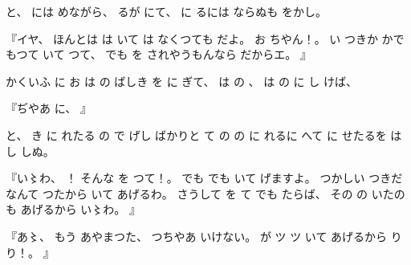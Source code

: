 %
と、
%
には
めながら、
%
るが
にて、
%
に
るには
ならぬも
をかし。

%
『イヤ、
%
ほんとは
は
いて
は
なくつても
だよ。
%
お
ちやん！。
%
い
つきか
かで
もつて
いて
つて、
%
でも
を
されやうもんなら
だからエ。
』

%
かくいふ
に
お
は
の
ばしき
を
に
ぎて、
%
は%
の
、
%
は%
の%
に
し
けば、

%
『ぢやあ
に、
』

%
と、
%
き
に
れたる
の
で
げし
ばかりと
て
の
の%
に
れるに
へて
に
せたるを
は
し
しぬ。

%
『い〻わ、%
%
！\inhibitglue{}
そんな
を
つて！。
%
でも
でも
いて
げますよ。
%
つかしい
つきだなんて
つたから
いて
あげるわ。
%
さうして
を
て
でも
たらば、
%
その
の
いたのも
あげるから
い〻わ。%
』

%
『あ〻、%
%
もう
あやまつた、
%
つちやあ
いけない。
%
が
ツ
ツ
いて
あげるから
り
り！。
』

